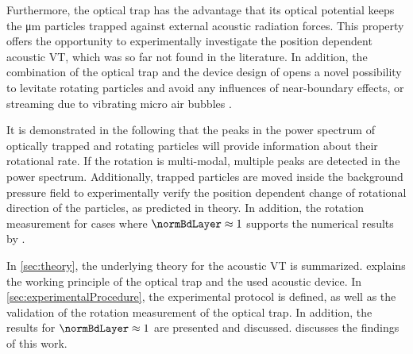 Furthermore, the optical trap has the advantage that its optical potential keeps 
the \si{\micro\meter} particles trapped against external acoustic radiation 
forces. This property offers the opportunity to experimentally investigate the 
position dependent acoustic VT, which was so far not found in the literature.  
In addition, the combination of the optical trap and the device design of 
\citeauthor{Schwarz} \cite{Schwarz} opens a novel possibility to levitate 
rotating particles and avoid any influences of near-boundary effects, or 
streaming due to vibrating micro air bubbles \cite{Lamprecht}.

It is demonstrated in the following that the peaks in the power spectrum of 
optically trapped and rotating particles will provide information about their 
rotational rate. If the rotation is multi-modal, multiple peaks are detected in 
the power spectrum. Additionally, trapped particles are moved inside the 
background pressure field to experimentally verify the position dependent change 
of rotational direction of the particles, as predicted in theory. In addition, 
the rotation measurement for cases where $\normBdLayer \approx 1$ supports the 
numerical results by \citeauthor{hahn2016}.

In \cref{sec:theory}, the underlying theory for the acoustic VT is summarized.  
 explains the working principle of the optical trap 
and the used acoustic device. In \cref{sec:experimentalProcedure}, the 
experimental protocol is defined, as well as the validation of the rotation 
measurement of the optical trap. In addition, the results for $\normBdLayer 
\approx 1$ are presented and discussed.  discusses the 
findings of this work.
